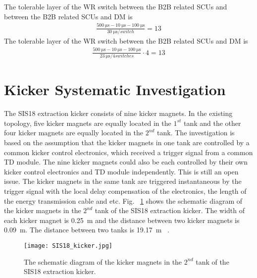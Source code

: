 The tolerable layer of the WR switch between the B2B related \gls{SCU}s and between the B2B related SCUs and DM is 
		\begin{equation}
		\begin{aligned}
			\frac{\SI{500}{\us}-\SI{10}{\us}-\SI{100}{\us}}{\SI{30}{\us/switch}}=13
		\label {num_switch_b}
		\end{aligned}
		\end{equation}
The tolerable layer of the WR switch between the B2B related \gls{SCU}s and DM is
		\begin{equation}
		\begin{aligned}
			\frac{\SI{500}{\us}-\SI{10}{\us}-\SI{100}{\us}}{\SI{23}{\us/4 switches}}\cdot 4=13
		\label {num_switch_b}
		\end{aligned}
		\end{equation}
%

\section{Kicker Systematic Investigation}
\label{real_kicker}
The SIS18 extraction kicker consists of nine kicker magnets. In the existing topology, five kicker magnets are equally located in the $1^{st}$ tank and the other four kicker magnets are equally located in the $2^{nd}$ tank. The investigation is based on the assumption that the kicker magnets in one tank are controlled by a common kicker control electronics, which received a trigger signal from a common TD module. The nine kicker magnets could also be each controlled by their own kicker control electronics and TD module independently. This is still an open issue. The kicker magnets in the same tank are triggered instantaneous by the trigger signal with the local delay compensation of the electronics, the length of the energy transmission cable and etc. Fig. ~\ref{SIS18_kicker} shows the schematic diagram of the kicker magnets in the $2^{nd}$ tank of the SIS18 extraction kicker. The width of each kicker magnet is \SI{0.25}{m} and the distance between two kicker magnets is \SI{0.09}{m}. The distance between two tanks is \SI{19.17}{m} ~\cite{ros_sis18_2008}. 
\begin{figure}[H]
   \centering   
   \texttt{[image: SIS18\_kicker.jpg]}
   \caption{The schematic diagram of the kicker magnets in the $2^{nd}$ tank of the SIS18 extraction kicker.}
   \label{SIS18_kicker}
\end{figure}

